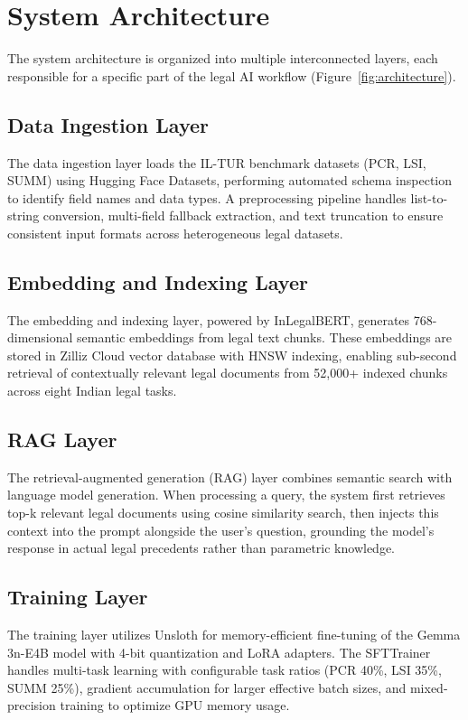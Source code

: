 \documentclass[11pt]{article}
\begin{document}
\section{System Architecture}

The system architecture is organized into multiple interconnected layers, each responsible for a specific part of the legal AI workflow (Figure~\ref{fig:architecture}).

\subsection{Data Ingestion Layer}

The data ingestion layer loads the IL-TUR benchmark datasets (PCR, LSI, SUMM) using Hugging Face Datasets, performing automated schema inspection to identify field names and data types. A preprocessing pipeline handles list-to-string conversion, multi-field fallback extraction, and text truncation to ensure consistent input formats across heterogeneous legal datasets.

\subsection{Embedding and Indexing Layer}

The embedding and indexing layer, powered by InLegalBERT, generates 768-dimensional semantic embeddings from legal text chunks. These embeddings are stored in Zilliz Cloud vector database with HNSW indexing, enabling sub-second retrieval of contextually relevant legal documents from 52,000+ indexed chunks across eight Indian legal tasks.

\subsection{RAG Layer}

The retrieval-augmented generation (RAG) layer combines semantic search with language model generation. When processing a query, the system first retrieves top-k relevant legal documents using cosine similarity search, then injects this context into the prompt alongside the user's question, grounding the model's response in actual legal precedents rather than parametric knowledge.

\subsection{Training Layer}

The training layer utilizes Unsloth for memory-efficient fine-tuning of the Gemma 3n-E4B model with 4-bit quantization and LoRA adapters. The SFTTrainer handles multi-task learning with configurable task ratios (PCR 40\%, LSI 35\%, SUMM 25\%), gradient accumulation for larger effective batch sizes, and mixed-precision training to optimize GPU memory usage.
\end{document}
